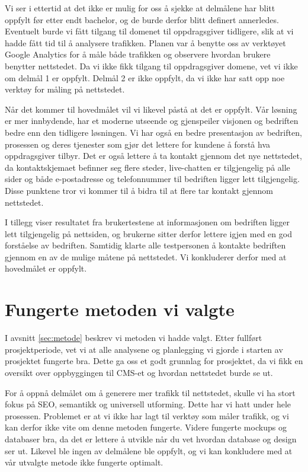 Vi ser i ettertid at det ikke er mulig for oss å sjekke at delmålene har blitt oppfylt før etter endt bachelor, og de burde derfor blitt definert annerledes. Eventuelt burde vi fått tilgang til domenet til oppdragsgiver tidligere, slik at vi hadde fått tid til å analysere trafikken. Planen var å benytte oss av verktøyet Google Analytics for å måle både trafikken og observere hvordan brukere benytter nettstedet. Da vi ikke fikk tilgang til oppdragsgiver domene, vet vi ikke om delmål 1 er oppfylt. Delmål 2 er ikke oppfylt, da vi ikke har satt opp noe verktøy for måling på nettstedet.

Når det kommer til hovedmålet vil vi likevel påstå at det er oppfylt. Vår løsning er mer innbydende, har et moderne utseende og gjenspeiler visjonen og bedriften bedre enn den tidligere løsningen. Vi har også en bedre presentasjon av bedriften, prosessen og deres tjenester som gjør det lettere for kundene å forstå hva oppdragsgiver tilbyr. Det er også lettere å ta kontakt gjennom det nye nettstedet, da kontaktskjemaet befinner seg flere steder, live-chatten er tilgjengelig på alle sider og både e-postadresse og telefonnummer til bedriften ligger lett tilgjengelig. Disse punktene tror vi kommer til å bidra til at flere tar kontakt gjennom nettstedet. 

I tillegg viser resultatet fra brukertestene at informasjonen om bedriften ligger lett tilgjengelig på nettsiden, og brukerne sitter derfor lettere igjen med en god forståelse av bedriften. Samtidig klarte alle testpersonen å kontakte bedriften gjennom en av de mulige måtene på nettstedet. Vi konkluderer derfor med at hovedmålet er oppfylt. 


\section{Fungerte metoden vi valgte}
I avsnitt \ref{sec:metode} beskrev vi metoden vi hadde valgt. Etter fullført prosjektperiode, vet vi at alle analysene og planlegging vi gjorde i starten av prosjektet fungerte bra. Dette ga oss et godt grunnlag for prosjektet, da vi fikk en oversikt over oppbyggingen til CMS-et og hvordan nettstedet burde se ut. 

For å oppnå delmålet om å generere mer trafikk til nettstedet, skulle vi ha stort fokus på SEO, semantikk og universell utforming. Dette har vi hatt under hele prosessen. Problemet er at vi ikke har lagt til verktøy som måler trafikk, og vi kan derfor ikke vite om denne metoden fungerte. Videre fungerte mockups og databaser bra, da det er lettere å utvikle når du vet hvordan database og design ser ut. Likevel ble ingen av delmålene ble oppfylt, og vi kan konkludere med at vår utvalgte metode ikke fungerte optimalt.

